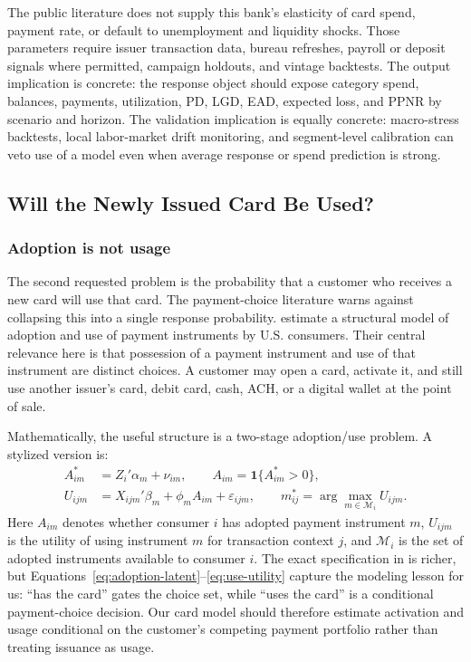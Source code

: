 \documentclass[11pt]{article}
\newcommand{\1}{\mathbf{1}}
\begin{document}
The public literature does not supply this bank's elasticity of card spend,
payment rate, or default to unemployment and liquidity shocks. Those
parameters require issuer transaction data, bureau refreshes, payroll or
deposit signals where permitted, campaign holdouts, and vintage backtests. The
output implication is concrete: the response object should expose category
spend, balances, payments, utilization, PD, LGD, EAD, expected loss, and PPNR
by scenario and horizon. The validation implication is equally concrete:
macro-stress backtests, local labor-market drift monitoring, and segment-level
calibration can veto use of a model even when average response or spend
prediction is strong.

\subsection{Will the Newly Issued Card Be Used?}
\label{sec:usage}

\subsubsection{Adoption is not usage}

The second requested problem is the probability that a customer who receives a
new card will use that card. The payment-choice literature warns against
collapsing this into a single response probability. \citet{koulayev2012payment}
estimate a structural model of adoption and use of payment instruments by U.S.
consumers. Their central relevance here is that possession of a payment
instrument and use of that instrument are distinct choices. A customer may open
a card, activate it, and still use another issuer's card, debit card, cash, ACH,
or a digital wallet at the point of sale.

Mathematically, the useful structure is a two-stage adoption/use problem. A
stylized version is:
\begin{align}
  A_{im}^*
    &= Z_i'\alpha_m + \nu_{im}, \qquad
       A_{im} = \1\{A_{im}^*>0\}, \label{eq:adoption-latent}\\
  U_{ijm}
    &= X_{ijm}'\beta_m + \phi_m A_{im} + \varepsilon_{ijm},
       \qquad
       m^*_{ij}=\arg\max_{m \in \mathcal{M}_i} U_{ijm}.
       \label{eq:use-utility}
\end{align}
Here $A_{im}$ denotes whether consumer $i$ has adopted payment instrument $m$,
$U_{ijm}$ is the utility of using instrument $m$ for transaction context $j$,
and $\mathcal{M}_i$ is the set of adopted instruments available to consumer
$i$. The exact specification in \citet{koulayev2012payment} is richer, but
Equations~\eqref{eq:adoption-latent}--\eqref{eq:use-utility} capture the
modeling lesson for us: ``has the card'' gates the choice set, while ``uses the
card'' is a conditional payment-choice decision. Our card model should therefore
estimate activation and usage conditional on the customer's competing payment
portfolio rather than treating issuance as usage.
\end{document}
